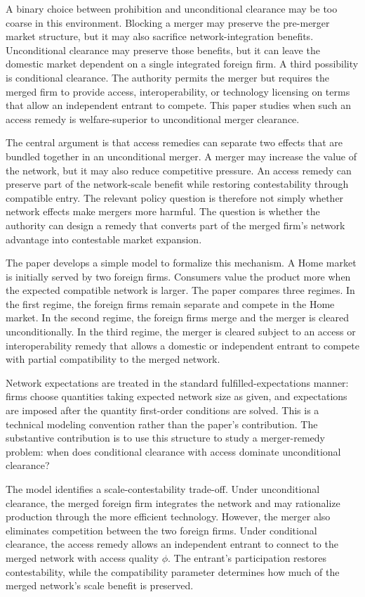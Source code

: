 \documentclass[12pt]{article}
\begin{document}
A binary choice between prohibition and unconditional clearance may be too coarse in this environment. Blocking a merger may preserve the pre-merger market structure, but it may also sacrifice network-integration benefits. Unconditional clearance may preserve those benefits, but it can leave the domestic market dependent on a single integrated foreign firm. A third possibility is conditional clearance. The authority permits the merger but requires the merged firm to provide access, interoperability, or technology licensing on terms that allow an independent entrant to compete. This paper studies when such an access remedy is welfare-superior to unconditional merger clearance.

The central argument is that access remedies can separate two effects that are bundled together in an unconditional merger. A merger may increase the value of the network, but it may also reduce competitive pressure. An access remedy can preserve part of the network-scale benefit while restoring contestability through compatible entry. The relevant policy question is therefore not simply whether network effects make mergers more harmful. The question is whether the authority can design a remedy that converts part of the merged firm's network advantage into contestable market expansion.

The paper develops a simple model to formalize this mechanism. A Home market is initially served by two foreign firms. Consumers value the product more when the expected compatible network is larger. The paper compares three regimes. In the first regime, the foreign firms remain separate and compete in the Home market. In the second regime, the foreign firms merge and the merger is cleared unconditionally. In the third regime, the merger is cleared subject to an access or interoperability remedy that allows a domestic or independent entrant to compete with partial compatibility to the merged network.

Network expectations are treated in the standard fulfilled-expectations manner: firms choose quantities taking expected network size as given, and expectations are imposed after the quantity first-order conditions are solved. This is a technical modeling convention rather than the paper's contribution. The substantive contribution is to use this structure to study a merger-remedy problem: when does conditional clearance with access dominate unconditional clearance?

The model identifies a scale-contestability trade-off. Under unconditional clearance, the merged foreign firm integrates the network and may rationalize production through the more efficient technology. However, the merger also eliminates competition between the two foreign firms. Under conditional clearance, the access remedy allows an independent entrant to connect to the merged network with access quality $\phi$. The entrant's participation restores contestability, while the compatibility parameter determines how much of the merged network's scale benefit is preserved.
\end{document}
